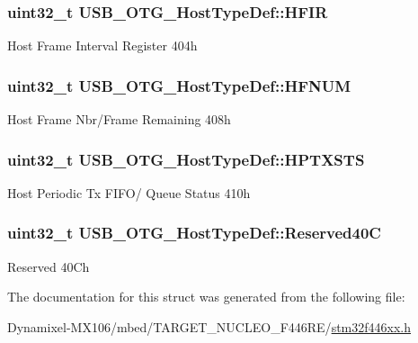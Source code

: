 \subsubsection[{\texorpdfstring{H\+F\+IR}{HFIR}}]{ uint32\+\_\+t U\+S\+B\+\_\+\+O\+T\+G\+\_\+\+Host\+Type\+Def\+::\+H\+F\+IR}\hypertarget{struct_u_s_b___o_t_g___host_type_def_a509fd299e7540892623954ea4dc1313c}{}\label{struct_u_s_b___o_t_g___host_type_def_a509fd299e7540892623954ea4dc1313c}
Host Frame Interval Register 404h 
\subsubsection[{\texorpdfstring{H\+F\+N\+UM}{HFNUM}}]{ uint32\+\_\+t U\+S\+B\+\_\+\+O\+T\+G\+\_\+\+Host\+Type\+Def\+::\+H\+F\+N\+UM}\hypertarget{struct_u_s_b___o_t_g___host_type_def_ab4f17f7ef96cf4933e30b1950925c613}{}\label{struct_u_s_b___o_t_g___host_type_def_ab4f17f7ef96cf4933e30b1950925c613}
Host Frame Nbr/\+Frame Remaining 408h 
\subsubsection[{\texorpdfstring{H\+P\+T\+X\+S\+TS}{HPTXSTS}}]{ uint32\+\_\+t U\+S\+B\+\_\+\+O\+T\+G\+\_\+\+Host\+Type\+Def\+::\+H\+P\+T\+X\+S\+TS}\hypertarget{struct_u_s_b___o_t_g___host_type_def_af095d2e3da9e07f63ed7da99276eaaca}{}\label{struct_u_s_b___o_t_g___host_type_def_af095d2e3da9e07f63ed7da99276eaaca}
Host Periodic Tx F\+I\+F\+O/ Queue Status 410h 
\subsubsection[{\texorpdfstring{Reserved40C}{Reserved40C}}]{\setlength{\rightskip}{0pt plus 5cm}uint32\+\_\+t U\+S\+B\+\_\+\+O\+T\+G\+\_\+\+Host\+Type\+Def\+::\+Reserved40C}\hypertarget{struct_u_s_b___o_t_g___host_type_def_a0d4a262443e6d12c065adcafabf787ee}{}\label{struct_u_s_b___o_t_g___host_type_def_a0d4a262443e6d12c065adcafabf787ee}
Reserved 40\+Ch 

The documentation for this struct was generated from the following file\+:\begin{DoxyCompactItemize}
\item 
Dynamixel-\/\+M\+X106/mbed/\+T\+A\+R\+G\+E\+T\+\_\+\+N\+U\+C\+L\+E\+O\+\_\+\+F446\+R\+E/\hyperlink{stm32f446xx_8h}{stm32f446xx.\+h}\end{DoxyCompactItemize}
